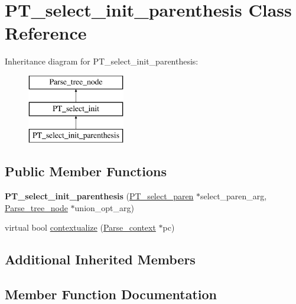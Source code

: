 \hypertarget{classPT__select__init__parenthesis}{}\section{P\+T\+\_\+select\+\_\+init\+\_\+parenthesis Class Reference}
\label{classPT__select__init__parenthesis}
Inheritance diagram for P\+T\+\_\+select\+\_\+init\+\_\+parenthesis\+:\begin{figure}[H]
\begin{center}
\leavevmode
\includegraphics[height=3.000000cm]{classPT__select__init__parenthesis}
\end{center}
\end{figure}
\subsection*{Public Member Functions}
\begin{DoxyCompactItemize}
\item 
\mbox{\label{classPT__select__init__parenthesis_a81432f1ec4f95efe53c741097964298d}} 
{\bfseries P\+T\+\_\+select\+\_\+init\+\_\+parenthesis} (\mbox{\hyperlink{classPT__select__paren}{P\+T\+\_\+select\+\_\+paren}} $\ast$select\+\_\+paren\+\_\+arg, \mbox{\hyperlink{classParse__tree__node}{Parse\+\_\+tree\+\_\+node}} $\ast$union\+\_\+opt\+\_\+arg)
\item 
virtual bool \mbox{\hyperlink{classPT__select__init__parenthesis_a29cc782cc10cdfb31f72074c827c043e}{contextualize}} (\mbox{\hyperlink{structParse__context}{Parse\+\_\+context}} $\ast$pc)
\end{DoxyCompactItemize}
\subsection*{Additional Inherited Members}


\subsection{Member Function Documentation}
\mbox{\label{classPT__select__init__parenthesis_a29cc782cc10cdfb31f72074c827c043e}} 
